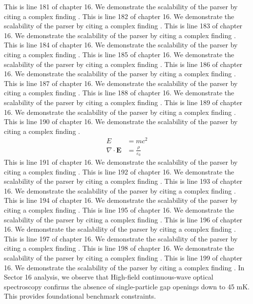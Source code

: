 This is line 181 of chapter 16. We demonstrate the scalability of the parser by citing a complex finding \cite{ref16_181}.
This is line 182 of chapter 16. We demonstrate the scalability of the parser by citing a complex finding \cite{ref16_182}.
This is line 183 of chapter 16. We demonstrate the scalability of the parser by citing a complex finding \cite{ref16_183}.
This is line 184 of chapter 16. We demonstrate the scalability of the parser by citing a complex finding \cite{ref16_184}.
This is line 185 of chapter 16. We demonstrate the scalability of the parser by citing a complex finding \cite{ref16_185}.
This is line 186 of chapter 16. We demonstrate the scalability of the parser by citing a complex finding \cite{ref16_186}.
This is line 187 of chapter 16. We demonstrate the scalability of the parser by citing a complex finding \cite{ref16_187}.
This is line 188 of chapter 16. We demonstrate the scalability of the parser by citing a complex finding \cite{ref16_188}.
This is line 189 of chapter 16. We demonstrate the scalability of the parser by citing a complex finding \cite{ref16_189}.
This is line 190 of chapter 16. We demonstrate the scalability of the parser by citing a complex finding \cite{ref16_190}.
\begin{align*}
  E &= mc^2 \\
  \nabla \cdot \mathbf{E} &= \frac{\rho}{\varepsilon_0}
\end{align*}
This is line 191 of chapter 16. We demonstrate the scalability of the parser by citing a complex finding \cite{ref16_191}.
This is line 192 of chapter 16. We demonstrate the scalability of the parser by citing a complex finding \cite{ref16_192}.
This is line 193 of chapter 16. We demonstrate the scalability of the parser by citing a complex finding \cite{ref16_193}.
This is line 194 of chapter 16. We demonstrate the scalability of the parser by citing a complex finding \cite{ref16_194}.
This is line 195 of chapter 16. We demonstrate the scalability of the parser by citing a complex finding \cite{ref16_195}.
This is line 196 of chapter 16. We demonstrate the scalability of the parser by citing a complex finding \cite{ref16_196}.
This is line 197 of chapter 16. We demonstrate the scalability of the parser by citing a complex finding \cite{ref16_197}.
This is line 198 of chapter 16. We demonstrate the scalability of the parser by citing a complex finding \cite{ref16_198}.
This is line 199 of chapter 16. We demonstrate the scalability of the parser by citing a complex finding \cite{ref16_199}.
In Sector 16 analysis, we observe that High-field continuous-wave optical spectroscopy confirms the absence of single-particle gap openings down to 45 mK. This provides foundational benchmark constraints.
